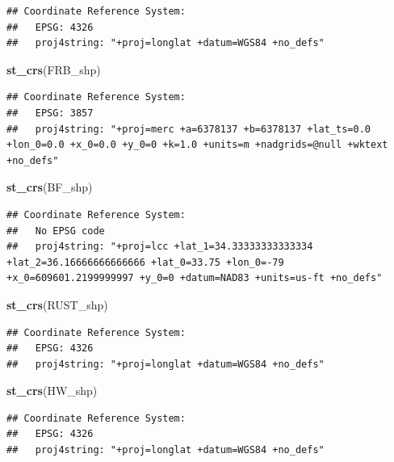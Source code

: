 \documentclass[12pt,]{article}
\newenvironment{Shaded}{\begin{snugshade}}{\end{snugshade}}
\newcommand{\KeywordTok}[1]{\textcolor[rgb]{0.13,0.29,0.53}{\textbf{#1}}}
\newcommand{\NormalTok}[1]{#1}
\begin{document}
\begin{verbatim}
## Coordinate Reference System:
##   EPSG: 4326 
##   proj4string: "+proj=longlat +datum=WGS84 +no_defs"
\end{verbatim}

\begin{Shaded}
\begin{Highlighting}[]
\KeywordTok{st_crs}\NormalTok{(FRB_shp)}
\end{Highlighting}
\end{Shaded}

\begin{verbatim}
## Coordinate Reference System:
##   EPSG: 3857 
##   proj4string: "+proj=merc +a=6378137 +b=6378137 +lat_ts=0.0 +lon_0=0.0 +x_0=0.0 +y_0=0 +k=1.0 +units=m +nadgrids=@null +wktext +no_defs"
\end{verbatim}

\begin{Shaded}
\begin{Highlighting}[]
\KeywordTok{st_crs}\NormalTok{(BF_shp)}
\end{Highlighting}
\end{Shaded}

\begin{verbatim}
## Coordinate Reference System:
##   No EPSG code
##   proj4string: "+proj=lcc +lat_1=34.33333333333334 +lat_2=36.16666666666666 +lat_0=33.75 +lon_0=-79 +x_0=609601.2199999997 +y_0=0 +datum=NAD83 +units=us-ft +no_defs"
\end{verbatim}

\begin{Shaded}
\begin{Highlighting}[]
\KeywordTok{st_crs}\NormalTok{(RUST_shp)}
\end{Highlighting}
\end{Shaded}

\begin{verbatim}
## Coordinate Reference System:
##   EPSG: 4326 
##   proj4string: "+proj=longlat +datum=WGS84 +no_defs"
\end{verbatim}

\begin{Shaded}
\begin{Highlighting}[]
\KeywordTok{st_crs}\NormalTok{(HW_shp)}
\end{Highlighting}
\end{Shaded}

\begin{verbatim}
## Coordinate Reference System:
##   EPSG: 4326 
##   proj4string: "+proj=longlat +datum=WGS84 +no_defs"
\end{verbatim}
\end{document}
